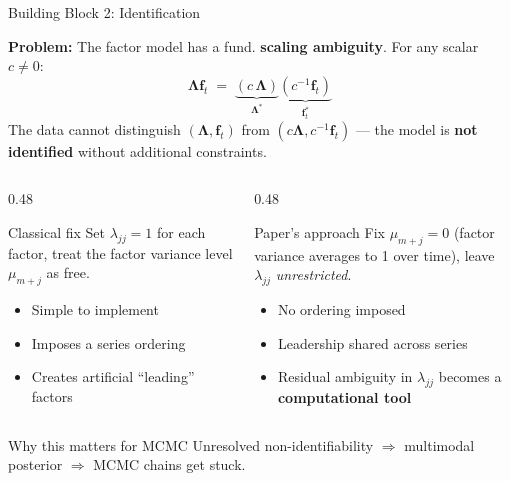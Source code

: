 \documentclass[10pt]{beamer}\usepackage[]{graphicx}\usepackage[table]{xcolor}
\begin{document}

\begin{frame}{Building Block 2: Identification}

  \textbf{Problem:} The factor model has a fund. \textbf{scaling ambiguity}.
  For any scalar $c \neq 0$:
  \[
    \boldsymbol{\Lambda}\mathbf{f}_t
    \;=\; \underbrace{(c\,\boldsymbol{\Lambda})}_{\boldsymbol{\Lambda}^*}
          \underbrace{(c^{-1}\mathbf{f}_t)}_{\mathbf{f}_t^*}
  \]
  The data cannot distinguish $(\boldsymbol{\Lambda}, \mathbf{f}_t)$ from
  $(c\boldsymbol{\Lambda}, c^{-1}\mathbf{f}_t)$ --- the model is
  \textbf{not identified} without additional constraints.

  \vspace{0.05em}

  \begin{columns}[T]
    \begin{column}{0.48\textwidth}
      \begin{block}{Classical fix}
        Set $\lambda_{jj} = 1$ for each factor,
        treat the factor variance level $\mu_{m+j}$ as free.
        \begin{itemize}
          \item[$+$] Simple to implement
          \item[$-$] Imposes a series ordering
          \item[$-$] Creates artificial ``leading'' factors
        \end{itemize}
      \end{block}
    \end{column}
    \begin{column}{0.48\textwidth}
      \begin{alertblock}{Paper's approach}
        Fix $\mu_{m+j} = 0$ (factor variance averages
        to 1 over time), leave $\lambda_{jj}$
        \emph{unrestricted}.
        \begin{itemize}
          \item[$+$] No ordering imposed
          \item[$+$] Leadership shared across series
          \item[$+$] Residual ambiguity in $\lambda_{jj}$
                becomes a \textbf{computational tool}
        \end{itemize}
      \end{alertblock}
    \end{column}
  \end{columns}


  \begin{block}{Why this matters for MCMC}
    Unresolved non-identifiability $\Rightarrow$ multimodal posterior
    $\Rightarrow$ MCMC chains get stuck.
  \end{block}

\end{frame}
\end{document}
